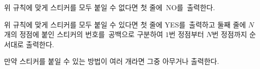 위 규칙에 맞게 스티커를 모두 붙일 수 없다면 첫 줄에 NO를 출력한다.

위 규칙에 맞게 스티커를 모두 붙일 수 있다면 첫 줄에 YES를 출력하고 둘째 줄에 $N$개의 정점에 붙인 스티커의 번호를 공백으로 구분하여 $1$번 정점부터 $N$번 정점까지 순서대로 출력한다.

만약 스티커를 붙일 수 있는 방법이 여러 개라면 그중 아무거나 출력한다.